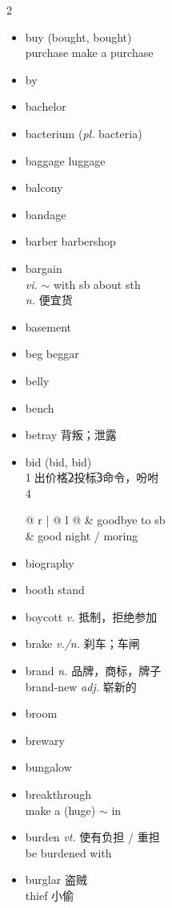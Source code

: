 \documentclass[../../book.tex]{subfiles}
\begin{document}
\begin{multicols}{2}
\begin{itemize}
\item[-] buy (bought, bought)
\\purchase \phantom{a} make a purchase
\item[-] by
\item[-] bachelor
\item[-] bacterium (\emph{pl.} bacteria)
\item[-] baggage \phantom{a} luggage
\item[-] balcony
\item[-] bandage
\item[-] barber \phantom{a} barbershop
\item[-] bargain
\\\emph{vi.} $\sim$ with sb about sth
\\\emph{n.} 便宜货
\item[-] basement
\item[-] beg \phantom{a} beggar
\item[-] belly
\item[-] bench
\item[-] betray 背叛；泄露
\item[-] bid (bid, bid)
\\\textcircled{1}出价格\textcircled{2}投标\textcircled{3}命令，吩咐
\\\textcircled{4}\begin{tabular}{@{} r | @{\hspace{0.1em}} l @{}}
 & goodbye \phantom{aaa} to sb
\\& good night / moring
\end{tabular}
\item[-] biography
\item[-] booth \phantom{a} stand
\item[-] boycott \emph{v.} 抵制，拒绝参加
\item[-] brake \emph{v./n.} 刹车；车闸
\item[-] brand \emph{n.} 品牌，商标，牌子
\\brand-new \emph{adj.} 崭新的
\item[-] broom
\item[-] brewary
\item[-] bungalow
\item[-] breakthrough
\\make a (huge) $\sim$ in
\item[-] burden \emph{vt.} 使有负担 / 重担
\\be burdened with
\item[-] burglar 盗贼
\\thief 小偷

\end{itemize}
\end{multicols}
\end{document}
